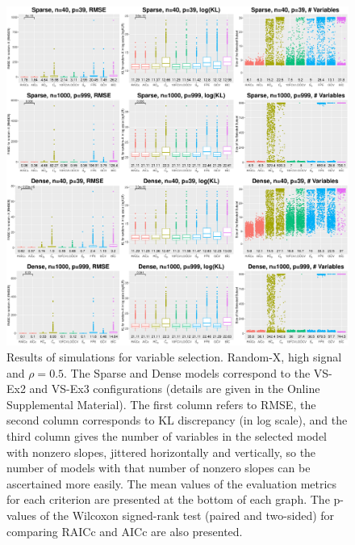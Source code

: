 \begin{figure}[!ht]
  \centering
  \includegraphics[width=\textwidth]{figures/main/randomx_VS_hsnr.eps}
  \caption{Results of simulations for variable selection. Random-X, high signal and $\rho=0.5$. The Sparse and Dense models correspond to the VS-Ex2 and VS-Ex3 configurations (details are given in the Online Supplemental Material). The first column refers to RMSE, the second column corresponds to KL discrepancy (in log scale), and the third column gives the number of variables in the selected model with nonzero slopes, jittered horizontally and vertically, so the number of models with that number of nonzero slopes can be ascertained more easily. The mean values of the evaluation metrics for each criterion are presented at the bottom of each graph. The p-values of the Wilcoxon signed-rank test (paired and two-sided) for comparing RAICc and AICc are also presented.}
  \label{fig:subsetselection_randomx_hsnr_largep}
\end{figure}


